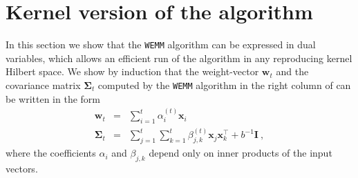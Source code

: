 \section{Kernel version of the algorithm}
\label{sec:WEMM_kernel}

In this section we show that the \texttt{WEMM} algorithm can be expressed in dual variables, which allows an efficient run of the algorithm in any reproducing kernel Hilbert space.
%
We show by induction that the weight-vector $\mathbf{w}_{t}$ and
the covariance matrix $\mathbf{\Sigma}_{t}$ computed by the \texttt{WEMM}
algorithm in the right column of  can be written in the form
\begin{eqnarray*}
\mathbf{w}_{t} & = & \sum_{i=1}^{t}\alpha_{i}^{\left(t\right)}\mathbf{x}_{i}\\
\mathbf{\Sigma}_{t} & = & \sum_{j=1}^{t}\sum_{k=1}^{t}\beta_{j,k}^{\left(t\right)}\mathbf{x}_{j}\mathbf{x}_{k}^{\top}+b^{-1}\mathbf{I}~,
\end{eqnarray*}
 where the coefficients $\alpha_{i}$ and $\beta_{j,k}$ depend only
on inner products of the input vectors.

